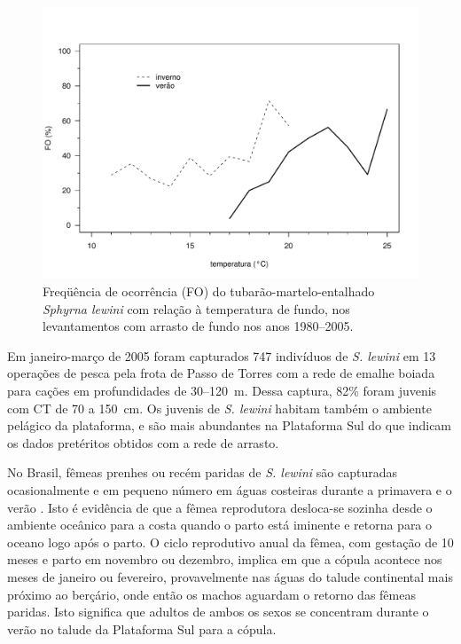 \documentclass[a4paper,11pt,twoside,showtrims,onecolumn,openright,final]{memoir}
\begin{document}
\begin{figure}
\begin{center}
\includegraphics[width=\textwidth]{Viola_DistribTempFundo}
\end{center}
\caption[Freqüência de ocorrência (FO) do tubarão-martelo-entalhado  \emph{Sphyrna lewini} 
	 com relação à temperatura de fundo]
	{Freqüência de ocorrência (FO) do tubarão-martelo-entalhado  \emph{Sphyrna lewini} 
	 com relação à temperatura de fundo, nos levantamentos com 
	 arrasto de fundo nos anos 1980--2005.}
\label{fig:lewini-distrib-tempfundo}
\end{figure}


Em janeiro-março de 2005 foram capturados 747 indivíduos de \emph{S. lewini} em 13 operações de pesca 
pela frota de Passo de Torres com a rede de emalhe boiada para cações em profundidades de 30--120~m. 
Dessa captura, 82\% foram juvenis com CT de 70 a 150~cm. Os juvenis de \emph{S. lewini} habitam 
também o ambiente pelágico da plataforma, e são mais abundantes na Plataforma Sul do que indicam 
os dados pretéritos obtidos com a rede de arrasto.

No Brasil, fêmeas prenhes ou recém paridas de \emph{S. lewini}  são capturadas ocasionalmente e em 
pequeno número em águas costeiras durante a primavera  e o verão \citep{sadowsky1967,galina2005}. %
Isto é evidência de que a fêmea reprodutora desloca-se sozinha desde o ambiente oceânico para a costa 
quando o parto está iminente e retorna para o oceano logo após o parto.  O ciclo reprodutivo anual 
da fêmea, com gestação de 10 meses e parto em novembro ou dezembro, implica em que a cópula acontece 
nos meses de janeiro ou fevereiro, provavelmente nas águas do talude continental mais próximo ao berçário, 
onde então os machos aguardam o retorno das fêmeas paridas. Isto significa que adultos de ambos os 
sexos se concentram durante o verão no talude da Plataforma Sul para a cópula.
\end{document}
